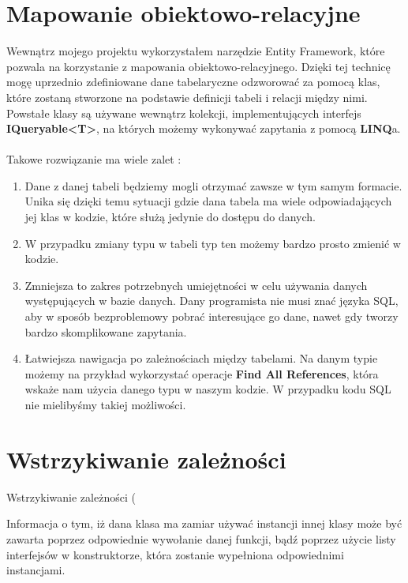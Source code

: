 \section{Mapowanie obiektowo-relacyjne}

Wewnątrz mojego projektu wykorzystałem narzędzie Entity Framework, które pozwala na korzystanie z mapowania obiektowo-relacyjnego. Dzięki tej technicę mogę uprzednio zdefiniowane dane tabelaryczne odzworować za pomocą klas, które zostaną stworzone na podstawie definicji tabeli i relacji między nimi. Powstałe klasy są używane wewnątrz kolekcji, implementujących interfejs \textbf{IQueryable<T>}, na których możemy wykonywać zapytania z pomocą \textbf{LINQ}a. 
\\ \\
Takowe rozwiązanie ma wiele zalet :
\begin{enumerate}
	\item Dane z danej tabeli będziemy mogli otrzymać zawsze w tym samym formacie. Unika się dzięki temu sytuacji gdzie dana tabela ma wiele odpowiadających jej klas w kodzie, które służą jedynie do dostępu do danych.
	\item W przypadku zmiany typu w tabeli typ ten możemy bardzo prosto zmienić w kodzie.
	\item Zmniejsza to zakres potrzebnych umiejętności w celu używania danych występujących w bazie danych. Dany programista nie musi znać języka SQL, aby w sposób bezproblemowy pobrać interesujące go dane, nawet gdy tworzy bardzo skomplikowane zapytania.
	\item Łatwiejsza nawigacja po zależnościach między tabelami. Na danym typie możemy na przykład wykorzystać operacje \textbf{Find All References}, która wskaże nam użycia danego typu w naszym kodzie. W przypadku kodu SQL nie mielibyśmy takiej możliwości.
\end{enumerate}

\section{Wstrzykiwanie zależności}

Wstrzykiwanie zależności (%

Informacja o tym, iż dana klasa ma zamiar używać instancji innej klasy może być zawarta poprzez odpowiednie wywołanie danej funkcji, bądź poprzez użycie listy interfejsów w konstruktorze, która zostanie wypełniona odpowiednimi instancjami.

